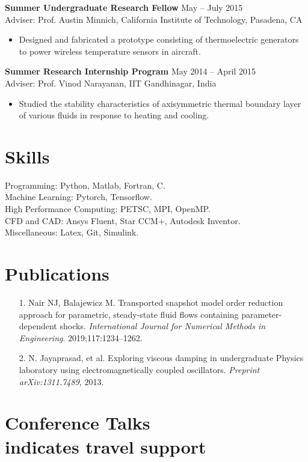 \documentclass[margin]{res}
\begin{document}
\begin{resume}
{\bf Summer Undergraduate Research Fellow} \hfill May -- July 2015\\
Adviser: Prof. Austin Minnich, California Institute of Technology, Pasadena, CA
\begin{itemize}
\item Designed and fabricated a prototype consisting of thermoelectric generators to
power wireless temperature sensors in aircraft.
\end{itemize}

{\bf Summer Research Internship Program} \hfill   May 2014 -- April 2015\\
Adviser: Prof. Vinod Narayanan, IIT Gandhinagar, India
\begin{itemize}
\item Studied the stability characteristics of axisymmetric thermal boundary layer of various fluids in response to heating and cooling.
\end{itemize}


\section{\large Skills}		 
Programming: Python, Matlab, Fortran, C.\\
Machine Learning: Pytorch, Tensorflow.\\
High Performance Computing: PETSC, MPI, OpenMP.\\
CFD and CAD: Ansys Fluent, Star CCM+, Autodesk Inventor.\\ 
Miscellaneous: Latex, Git, Simulink.

\section{\large Publications}
 \begin{itemize}
 \item[1.] Nair NJ, Balajewicz M. Transported snapshot model order reduction approach for parametric, steady-state fluid flows containing parameter-dependent shocks. \textit{International Journal for Numerical Methods in Engineering}. 2019;117:1234–1262.
 
  \item[2.] N. Jayaprasad, et al. Exploring viscous damping in undergraduate Physics laboratory using electromagnetically coupled oscillators. \textit{Preprint arXiv:1311.7489}, 2013.
 \end{itemize}
 
\section{\large Conference Talks \\ \small * indicates travel support}


\end{resume}
\end{document}
